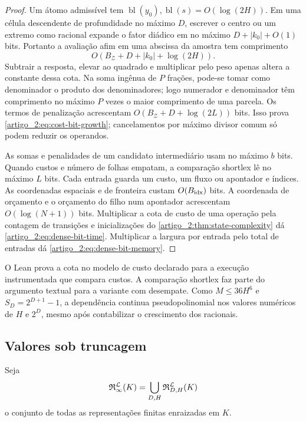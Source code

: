 \begin{proof}
Um átomo admissível tem $\operatorname{bl}(y_0),
\operatorname{bl}(s)=O(\log(2H))$. Em uma célula descendente de profundidade
no máximo $D$, escrever o centro ou um extremo como racional expande o fator
diádico em no máximo $D+|k_0|+O(1)$ bits. Portanto a avaliação afim em uma
abscissa da amostra tem comprimento
\[
 O(B_{\mathcal Z}+D+|k_0|+\log(2H)).
\]
Subtrair a resposta, elevar ao quadrado e multiplicar pelo peso apenas altera
a constante dessa cota. Na soma ingênua de $P$ frações, pode-se tomar como
denominador o produto dos denominadores; logo numerador e denominador têm
comprimento no máximo $P$ vezes o maior comprimento de uma parcela. Os termos
de penalização acrescentam $O(B_{\mathcal Z}+D+\log(2L))$ bits. Isso prova
\eqref{artigo_2:eq:cost-bit-growth}; cancelamentos por máximo divisor comum só podem
reduzir os operandos.

As somas e penalidades de um candidato intermediário usam no máximo
$b$ bits. Quando custos e número de folhas empatam, a comparação shortlex
lê no máximo $L$ bits. Cada entrada guarda um custo, um fluxo ou apontador
e índices. As coordenadas espaciais e de fronteira custam
$O(B_{\rm idx})$ bits. A coordenada de orçamento e o orçamento do filho
num apontador acrescentam $O(\log(N+1))$ bits. Multiplicar a cota de custo de
uma operação pela contagem de transições e inicializações do
\cref{artigo_2:thm:state-complexity} dá \eqref{artigo_2:eq:dense-bit-time}.
Multiplicar a largura por entrada pelo total de entradas dá
\eqref{artigo_2:eq:dense-bit-memory}.
\end{proof}

O Lean prova a cota no modelo de custo declarado para a execução instrumentada
que compara custos. A comparação shortlex faz parte do argumento textual
para a variante com desempate. Como $M\le36H^6$ e $S_D=2^{D+1}-1$,
a dependência continua pseudopolinomial nos valores numéricos de $H$ e $2^D$,
mesmo após contabilizar o crescimento dos racionais.

\subsection{Valores sob truncagem}

Seja
\[
 \mathfrak{R}_{\infty}^{\mathcal{L}}(K)
 =\bigcup_{D,H}\mathfrak{R}_{D,H}^{\mathcal{L}}(K)
\]
o conjunto de todas as representações finitas enraizadas em $K$.

